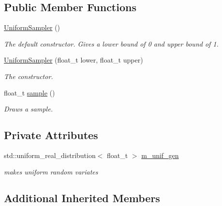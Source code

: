 \subsection*{Public Member Functions}
\begin{DoxyCompactItemize}
\item 
\mbox{\label{classrvsamp_1_1UniformSampler_a0e1d5480bdc2a16d8d4ff39710c06e22}} 
\hyperlink{classrvsamp_1_1UniformSampler_a0e1d5480bdc2a16d8d4ff39710c06e22}{Uniform\+Sampler} ()
\begin{DoxyCompactList}\small\item\em The default constructor. Gives a lower bound of 0 and upper bound of 1. \end{DoxyCompactList}\item 
\hyperlink{classrvsamp_1_1UniformSampler_a909a8202baf85b8b541d6e339c0e1b18}{Uniform\+Sampler} (float\+\_\+t lower, float\+\_\+t upper)
\begin{DoxyCompactList}\small\item\em The constructor. \end{DoxyCompactList}\item 
float\+\_\+t \hyperlink{classrvsamp_1_1UniformSampler_acc8866283171489eccc5f643269b6eed}{sample} ()
\begin{DoxyCompactList}\small\item\em Draws a sample. \end{DoxyCompactList}\end{DoxyCompactItemize}
\subsection*{Private Attributes}
\begin{DoxyCompactItemize}
\item 
\mbox{\label{classrvsamp_1_1UniformSampler_a015cefddd5e6e88f8a7318daec2211cc}} 
std\+::uniform\+\_\+real\+\_\+distribution$<$ float\+\_\+t $>$ \hyperlink{classrvsamp_1_1UniformSampler_a015cefddd5e6e88f8a7318daec2211cc}{m\+\_\+unif\+\_\+gen}
\begin{DoxyCompactList}\small\item\em makes uniform random variates \end{DoxyCompactList}\end{DoxyCompactItemize}
\subsection*{Additional Inherited Members}


